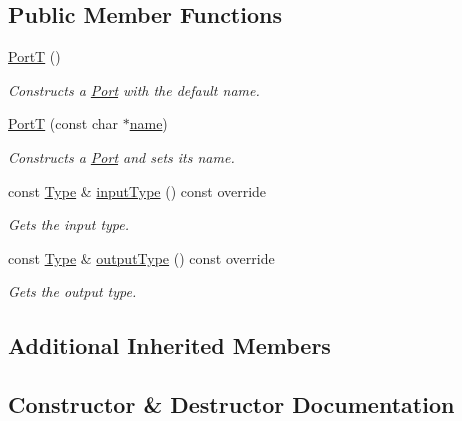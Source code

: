 \subsection*{Public Member Functions}
\begin{DoxyCompactItemize}
\item 
\hyperlink{structdg_1_1deepcore_1_1_port_t_ae1547e0d2e07c7fd430b8aec2f0cd299}{PortT} ()
\begin{DoxyCompactList}\small\item\em Constructs a \hyperlink{classdg_1_1deepcore_1_1_port}{Port} with the default name. \end{DoxyCompactList}\item 
\hyperlink{structdg_1_1deepcore_1_1_port_t_a583e2ee5b7e58522f59aa3a61eb0f69b}{PortT} (const char $\ast$\hyperlink{classdg_1_1deepcore_1_1_named_object_ab1379a28467dd39a81ceb02cf50dedde}{name})
\begin{DoxyCompactList}\small\item\em Constructs a \hyperlink{classdg_1_1deepcore_1_1_port}{Port} and sets its name. \end{DoxyCompactList}\item 
const \hyperlink{classdg_1_1deepcore_1_1_type}{Type} \& \hyperlink{structdg_1_1deepcore_1_1_port_t_abeb153653191a5b4e6f4d16a285dbac4}{input\+Type} () const override
\begin{DoxyCompactList}\small\item\em Gets the input type. \end{DoxyCompactList}\item 
const \hyperlink{classdg_1_1deepcore_1_1_type}{Type} \& \hyperlink{structdg_1_1deepcore_1_1_port_t_abbf359eaba346394c9f63af855153899}{output\+Type} () const override
\begin{DoxyCompactList}\small\item\em Gets the output type. \end{DoxyCompactList}\end{DoxyCompactItemize}
\subsection*{Additional Inherited Members}


\subsection{Constructor \& Destructor Documentation}
